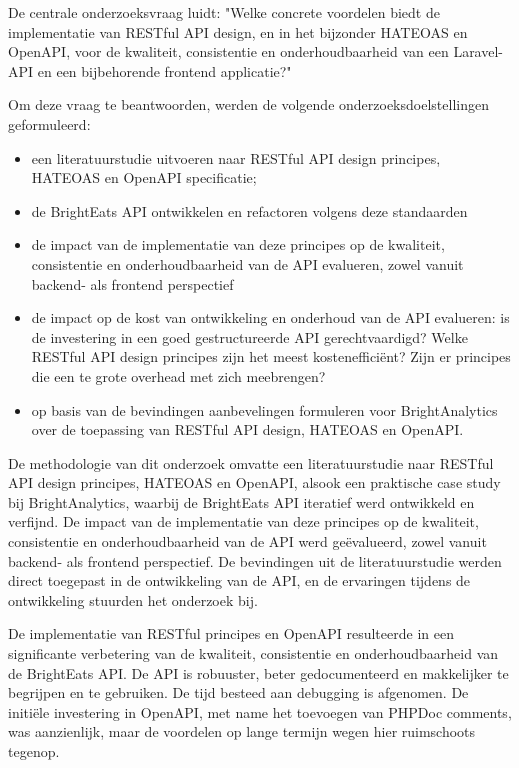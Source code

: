 \bigskip

De centrale onderzoeksvraag luidt: "Welke concrete voordelen biedt de implementatie van RESTful API design, en in het bijzonder HATEOAS en OpenAPI, voor de kwaliteit, consistentie en onderhoudbaarheid van een Laravel-API en een bijbehorende frontend applicatie?"

\bigskip

Om deze vraag te beantwoorden, werden de volgende onderzoeksdoelstellingen geformuleerd:

\begin{itemize}
  \item een literatuurstudie uitvoeren naar RESTful API design principes, HATEOAS en OpenAPI specificatie;
  \item de BrightEats API ontwikkelen en refactoren volgens deze standaarden
  \item de impact van de implementatie van deze principes op de kwaliteit, consistentie en onderhoudbaarheid van de API evalueren, zowel vanuit backend- als frontend perspectief
  \item de impact op de kost van ontwikkeling en onderhoud van de API evalueren: is de investering in een goed gestructureerde API gerechtvaardigd? Welke RESTful API design principes zijn het meest kostenefficiënt? Zijn er principes die een te grote overhead met zich meebrengen?
  \item op basis van de bevindingen aanbevelingen formuleren voor BrightAnalytics over de toepassing van RESTful API design, HATEOAS en OpenAPI.
\end{itemize}

\bigskip

De methodologie van dit onderzoek omvatte een literatuurstudie naar RESTful API design principes, HATEOAS en OpenAPI, alsook een praktische case study bij BrightAnalytics, waarbij de BrightEats API iteratief werd ontwikkeld en verfijnd. De impact van de implementatie van deze principes op de kwaliteit, consistentie en onderhoudbaarheid van de API werd geëvalueerd, zowel vanuit backend- als frontend perspectief. De bevindingen uit de literatuurstudie werden direct toegepast in de ontwikkeling van de API, en de ervaringen tijdens de ontwikkeling stuurden het onderzoek bij.

\bigskip

De implementatie van RESTful principes en OpenAPI resulteerde in een significante verbetering van de kwaliteit, consistentie en onderhoudbaarheid van de BrightEats API. De API is robuuster, beter gedocumenteerd en makkelijker te begrijpen en te gebruiken. De tijd besteed aan debugging is afgenomen. De initiële investering in OpenAPI, met name het toevoegen van PHPDoc comments, was aanzienlijk, maar de voordelen op lange termijn wegen hier ruimschoots tegenop.

